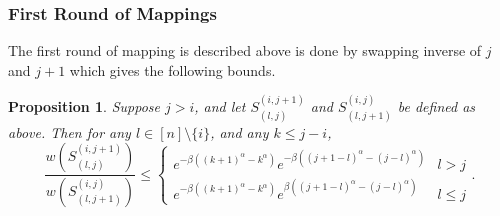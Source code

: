 \documentclass{article}
\newtheorem{proposition}[theorem]{Proposition} %
\begin{document}
\subsubsection{First Round of Mappings}


The first round of mapping is described above is done by swapping inverse of $j$ and $j+1$ which gives the following bounds.
\begin{proposition}
\label{prop:first-mapping}
Suppose $j > i$, and let $S^{(i,j+1)}_{(l,j)}$ and $S^{(i,j)}_{(l,j+1)}$ be defined as above.  Then for any $l\in[n]\setminus\{i\}$, and any $k\leq j-i$,
\[\frac{w(S^{(i,j+1)}_{(l,j)})}{w(S^{(i,j)}_{(l,j+1)})}\leq \begin{cases}
    e^{-\beta((k+1)^\alpha-k^\alpha)}e^{-\beta((j+1-l)^\alpha-(j-l)^\alpha)} & l>j\\
e^{-\beta((k+1)^\alpha-k^\alpha)}e^{\beta((j+1-l)^\alpha-(j-l)^\alpha)} &  l\leq j
\end{cases}.\]
\end{proposition}
\end{document}
